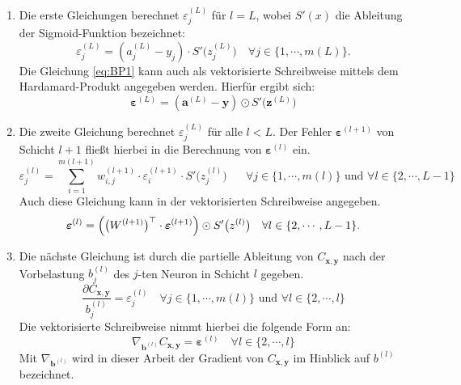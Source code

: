  
\begin{enumerate}
\item Die erste Gleichungen berechnet $\varepsilon^{(L)}_j$ für $l=L$, wobei $S'(x)$ die Ableitung der Sigmoid-Funktion bezeichnet:
\begin{equation}
	\label{eq:BP1}
	\varepsilon^{(L)}_j = (a_j^{(L)} - y_j) \cdot S'\bigl(z_j^{(L)}\bigr)
	\quad \mbox{$\forall j \in \{1, \cdots, m(L)\}$}.
\end{equation}
Die Gleichung \ref{eq:BP1} kann auch als vektorisierte Schreibweise mittels dem Hardamard-Produkt angegeben werden. Hierfür ergibt sich:
\begin{equation}
  \label{eq:BP1s}
\boldsymbol{\varepsilon}^{(L)} = (\mathbf{a}^{(L)} - \mathbf{y}) \odot S'\bigl(\mathbf{z}^{(L)}\bigr)  
\end{equation}
    
\item Die zweite Gleichung berechnet $\varepsilon^{(L)}_j$ für alle $l<L$. Der Fehler $\boldsymbol{\varepsilon}^{(l+1)}$ von Schicht $l+1$ fließt hierbei in die Berechnung von $\boldsymbol{\varepsilon}^{(l)}$ ein.
\begin{equation}
	\label{eq:BP2}
	\varepsilon^{(l)}_j = \sum\limits_{i=1}^{m(l+1)} w_{i,j}^{(l+1)} \cdot 			\varepsilon^{(l+1)}_i \cdot S'\bigl(z^{(l)}_j\bigr) \quad \mbox{ $\forall j \in \{1, \cdots, m(l)\}$ und $\forall l \in \{2, \cdots, L-1\}$}
\end{equation}
Auch diese Gleichung kann in der vektorisierten Schreibweise angegeben.
\begin{equation}
  \label{eq:BP2v}
  \boldsymbol{\varepsilon}^{(l)} = \Bigl(\bigl(W^{(l+1)}\bigr)^\top \cdot \boldsymbol{\varepsilon}^{(l+1)}\Bigr) \odot
  S'\bigl(z^{(l)}\bigr) \quad \mbox{$\forall l \in \{2, \cdots, L-1\}$}.
\end{equation}

\item Die nächste Gleichung ist durch die partielle Ableitung von $C_{\mathbf{x},\mathbf{y}}$ nach der Vorbelastung $b_j^{(l)}$ des $j$-ten Neuron in Schicht $l$ gegeben.
\begin{equation}
  \label{eq:BP3}
  \frac{\partial C_{\mathbf{x}, \mathbf{y}}}{b_j^{(l)}} = \varepsilon_j^{(l)}
  \quad \mbox{$\forall j \in \{1,\cdots,m(l)\}$ und $\forall l \in \{2, \cdots,l\}$}
\end{equation}
Die vektorisierte Schreibweise nimmt hierbei die folgende Form an:
\begin{equation}
  \label{eq:BP3v}
  \nabla_{\mathbf{b}^{(l)}} C_{\mathbf{x}, \mathbf{y}} = \boldsymbol{\varepsilon}^{(l)}
  \quad \mbox{$\forall l \in \{2, \cdots,l\}$}
\end{equation}
Mit $\nabla_{\mathbf{b}^{(l)}}$ wird in dieser Arbeit der Gradient von $C_{\mathbf{x},\mathbf{y}}$ im Hinblick auf $b^{(l)}$ bezeichnet.


\end{enumerate}
